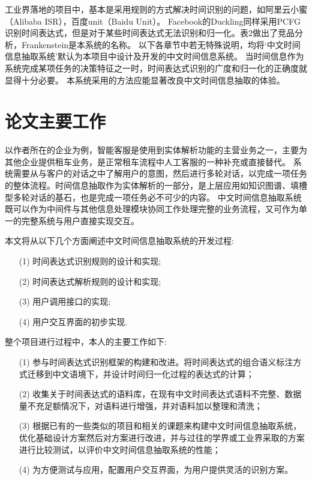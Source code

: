 工业界落地的项目中，基本是采用规则的方式解决时间识别的问题，如阿里云小蜜（Alibaba ISR），百度unit（Baidu Unit）。
Facebook的Duckling同样采用PCFG识别时间表达式，但是对于某些时间表达式无法识别和归一化。表2做出了竞品分析，Frankenstein是本系统的名称。
以下各章节中若无特殊说明，均将‘中文时间信息抽取系统’默认为本项目中设计及开发的中文时间信息系统。
当时间信息作为系统完成某项任务的决策特征之一时，时间表达式识别的广度和归一化的正确度就显得十分必要。
本系统采用的方法应能显著改良中文时间信息抽取的体验。


\section{论文主要工作}

以作者所在的企业为例，智能客服是使用到实体解析功能的主营业务之一，主要为其他企业提供租车业务，是正常租车流程中人工客服的一种补充或直接替代。
系统需要从与客户的对话之中了解用户的意图，然后进行多轮对话，以完成一项任务的整体流程。时间信息抽取作为实体解析的一部分，是上层应用如知识图谱、填槽型多轮对话的基石，也是完成一项任务必不可少的内容。
中文时间信息抽取系统既可以作为中间件与其他信息处理模块协同工作处理完整的业务流程，又可作为单一的完整系统与用户直接实现交互。

本文将从以下几个方面阐述中文时间信息抽取系统的开发过程:
\begin{enumerate}
    \item[(1)] 时间表达式识别规则的设计和实现;
    \item[(2)] 时间表达式解析规则的设计和实现;
    \item[(3)] 用户调用接口的实现;
    \item[(4)] 用户交互界面的初步实现.
\end{enumerate}

整个项目进行过程中，本人的主要工作如下:
\begin{enumerate}
    \item[(1)] 参与时间表达式识别框架的构建和改进。将时间表达式的组合语义标注方式迁移到中文语境下，并设计时间归一化过程的表达式的计算；
    \item[(2)] 收集关于时间表达式的语料库，在现有中文时间表达式语料不完整、数据量不充足额情况下，对语料进行增强，并对语料加以整理和清洗；
    \item[(3)] 根据已有的一些类似的项目和相关的课题来构建中文时间信息抽取系统，优化基础设计方案然后对方案进行改进，并与过往的学界或工业界采取的方案进行比较测试，以评价中文时间信息抽取系统的性能；
    \item[(4)] 为方便测试与应用，配置用户交互界面，为用户提供灵活的识别方案。
\end{enumerate}


